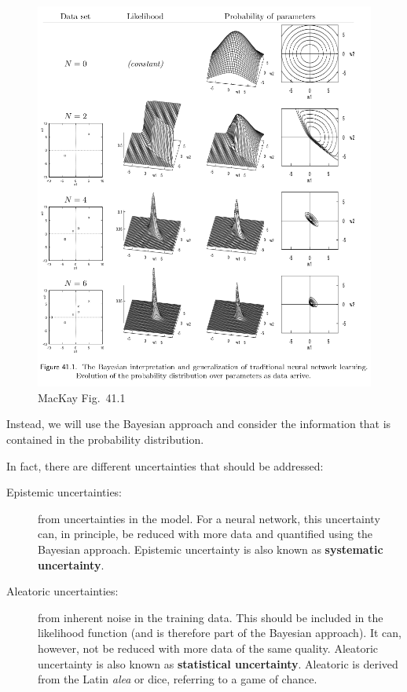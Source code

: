 \documentclass[%
oneside,                 %
final,                   %
10pt]{article}
\begin{document}
\begin{figure}[!ht]  %
  \centerline{\includegraphics[width=0.8\linewidth]{fig/MacKay_41_1.png}}
  \caption{
  MacKay Fig.~41.1
  }
\end{figure}


Instead, we will use the Bayesian approach and consider the information that is contained in the probability distribution. 

In fact, there are different uncertainties that should be addressed:

\begin{description}
\item[Epistemic uncertainties:] 
  from uncertainties in the model. For a neural network, this uncertainty can, in principle, be reduced with more data and quantified using the Bayesian approach. Epistemic uncertainty is also known as \textbf{systematic uncertainty}.

\item[Aleatoric uncertainties:] 
  from inherent noise in the training data. This should be included in the likelihood function (and is therefore part of the Bayesian approach). It can, however, not be reduced with more data of the same quality. Aleatoric uncertainty is also known as \textbf{statistical uncertainty}. Aleatoric is derived from the Latin \emph{alea} or dice, referring to a game of chance.
\end{description}
\end{document}
